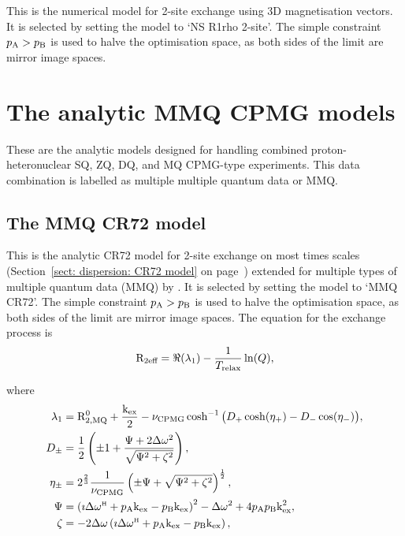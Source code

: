 This is the numerical model for 2-site exchange using 3D magnetisation vectors.
It is selected by setting the model to `NS R1rho 2-site'.
The simple constraint $p_\textrm{A} > p_\textrm{B}$ is used to halve the optimisation space, as both sides of the limit are mirror image spaces.




\section{The analytic MMQ CPMG models}
\label{sect: dispersion: analytic MMQ CPMG models}

These are the analytic models designed for handling combined proton-heteronuclear SQ, ZQ, DQ, and MQ CPMG-type experiments.
This data combination is labelled as multiple multiple quantum data or MMQ.



\subsection{The MMQ CR72 model}
\label{sect: dispersion: MMQ CR72 model}

This is the analytic CR72 model for 2-site exchange on most times scales (Section~\ref{sect: dispersion: CR72 model} on page~\pageref{sect: dispersion: CR72 model}) extended for multiple types of multiple quantum data (MMQ) by \citet{Korzhnev04a}.
It is selected by setting the model to `MMQ CR72'.
The simple constraint $p_\textrm{A} > p_\textrm{B}$ is used to halve the optimisation space, as both sides of the limit are mirror image spaces.
The equation for the exchange process is 
\begin{equation}
    \mathrm{R}_\textrm{2eff} = \Re(\lambda_1) - \frac{1}{T_\textrm{relax}}\ln(Q),
\end{equation}

where
\begin{align}
    \lambda_1 &= \mathrm{R}_\mathrm{2,MQ}^0 + \frac{\textrm{k}_\textrm{ex}}{2} - \nu_\textrm{CPMG}\cosh^{-1} \big( D_+\cosh(\eta_+) - D_-\cos(\eta_-) \big), \\
    D_\pm     &= \frac{1}{2} \left( \pm1 + \frac{\Psi + 2\Delta\omega^2}{\sqrt{\Psi^2 + \zeta^2}} \right) , \\
    \eta_\pm  &= 2^{\frac{2}{3}}\frac{1}{\nu_\textrm{CPMG}} \left( \pm\Psi + \sqrt{\Psi^2 + \zeta^2} \right)^{\frac{1}{2}} , \\
    \Psi      &= \left( \imath \Delta\omega^{\scriptscriptstyle\mathrm{H}} + p_\textrm{A}\textrm{k}_\textrm{ex} - p_\textrm{B}\textrm{k}_\textrm{ex} \right)^2 - \Delta\omega^2 + 4p_\textrm{A}p_\textrm{B}\textrm{k}_\textrm{ex}^2 , \\
    \zeta     &= -2\Delta\omega \left( \imath \Delta\omega^{\scriptscriptstyle\mathrm{H}} + p_\textrm{A}\textrm{k}_\textrm{ex} - p_\textrm{B}\textrm{k}_\textrm{ex} \right),
\end{align}

